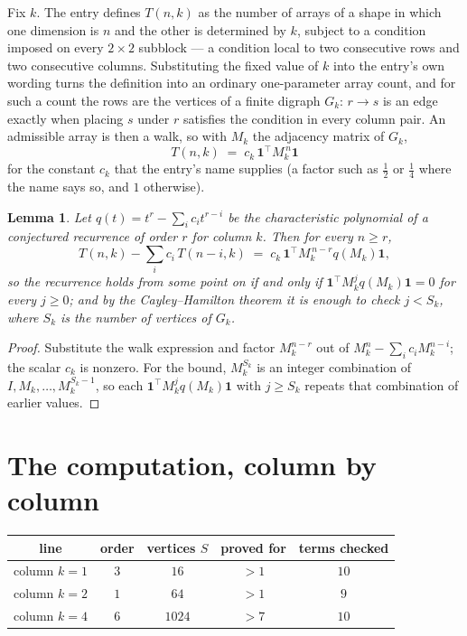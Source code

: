 \documentclass[11pt,a4paper]{article}
\theoremstyle{plain}
\newtheorem{lemma}[theorem]{Lemma}
\theoremstyle{definition}
\begin{document}
Fix $k$. The entry defines $T(n,k)$ as the number of arrays of a shape in which one dimension
is $n$ and the other is determined by $k$, subject to a condition imposed on every
$2\times2$ subblock --- a condition local to two consecutive rows and two consecutive columns.
Substituting the fixed value of $k$ into the entry's own wording turns the definition into an
ordinary one-parameter array count, and for such a count the rows are the vertices of a finite
digraph $G_k$: $r\to s$ is an edge exactly when placing $s$ under $r$ satisfies the condition
in every column pair. An admissible array is then a walk, so with $M_k$ the adjacency matrix
of $G_k$,
\[
T(n,k)\;=\;c_k\,\mathbf{1}^{\!\top}M_k^{\,n}\mathbf{1}
\]
for the constant $c_k$ that the entry's name supplies (a factor such as $\tfrac12$ or
$\tfrac14$ where the name says so, and $1$ otherwise).

\begin{lemma}\label{lem:crit}
Let $q(t)=t^{r}-\sum_i c_it^{r-i}$ be the characteristic polynomial of a conjectured
recurrence of order $r$ for column $k$. Then for every $n\ge r$,
\[
T(n,k)-\sum_i c_i\,T(n-i,k)\;=\;c_k\,\mathbf{1}^{\!\top}M_k^{\,n-r}q(M_k)\mathbf{1},
\]
so the recurrence holds from some point on if and only if
$\mathbf{1}^{\!\top}M_k^{j}q(M_k)\mathbf{1}=0$ for every $j\ge0$; and by the
Cayley--Hamilton theorem it is enough to check $j<S_k$, where $S_k$ is the number of vertices
of $G_k$.
\end{lemma}

\begin{proof}
Substitute the walk expression and factor $M_k^{n-r}$ out of $M_k^{n}-\sum_ic_iM_k^{n-i}$;
the scalar $c_k$ is nonzero. For the bound, $M_k^{S_k}$ is an integer combination of
$I,M_k,\dots,M_k^{S_k-1}$, so each $\mathbf{1}^{\!\top}M_k^{j}q(M_k)\mathbf{1}$ with
$j\ge S_k$ repeats that combination of earlier values.
\end{proof}

\section{The computation, column by column}

\begin{center}
\begin{tabular}{ccccc}
line & order & vertices $S$ & proved for & terms checked \\ \hline
column $k$$=1$ & $3$ & $16$ & $>1$ & $10$ \\
column $k$$=2$ & $1$ & $64$ & $>1$ & $9$ \\
column $k$$=4$ & $6$ & $1024$ & $>7$ & $10$ \\
\end{tabular}
\end{center}
\end{document}
